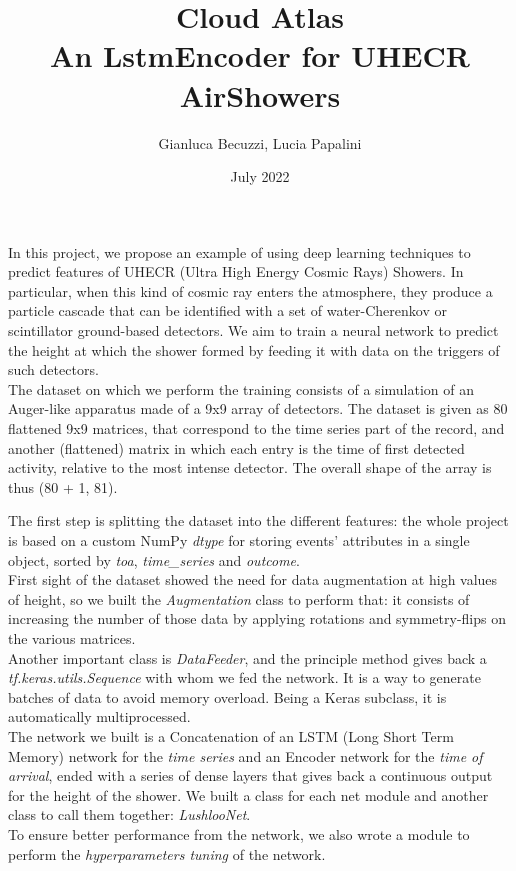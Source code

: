 \documentclass{article}
\title{Cloud Atlas \\[1ex] \large An LstmEncoder for UHECR AirShowers}
\author{Gianluca Becuzzi, Lucia Papalini}
\date{July 2022}
\begin{document}
\maketitle

In this project, we propose an example of using deep learning techniques to predict features of UHECR 
(Ultra High Energy Cosmic Rays) Showers.
In particular, when this kind of cosmic ray enters the atmosphere, they produce a particle cascade 
that can be identified with a set of water-Cherenkov or scintillator ground-based detectors. We aim to train a neural network to predict the height at which the shower formed by feeding it with data on the triggers of such detectors.\\
The dataset on which we perform the training consists of a simulation of an Auger-like apparatus 
made of a 9x9 array of detectors. The dataset is given as 80 flattened 9x9 matrices, that correspond to the time series part of the record, and another (flattened) matrix
in which each entry is the time of first detected activity, relative to the most intense detector.
The overall shape of the array is thus (80 + 1, 81).

The first step is splitting the dataset into the different features: the whole project is based on a custom NumPy \textit{dtype} for storing events' attributes in a single object, sorted by \textit{toa}, \textit{time\_series} and \textit{outcome}.\\
First sight of the dataset showed the need for data augmentation at high values of height, so we built the \textit{Augmentation} class to perform that: it consists of increasing the number of those data by applying rotations and symmetry-flips on the various matrices.\\
Another important class is \textit{DataFeeder}, and the principle method gives back a \textit{tf.keras.utils.Sequence} 
with whom we fed the network. It is a way to generate batches of data to avoid memory overload. Being a Keras subclass, it is automatically multiprocessed.\\
The network we built is a Concatenation of an LSTM (Long Short Term Memory) network for the \textit{time series} and an Encoder network for the \textit{time of arrival}, ended with a series of dense layers that gives back a continuous output for the height of the shower. We built a class for each net module and another class to call them together: \textit{LushlooNet}.\\
To ensure better performance from the network, we also wrote a module to perform the \textit{hyperparameters tuning} of the network.
\end{document}

